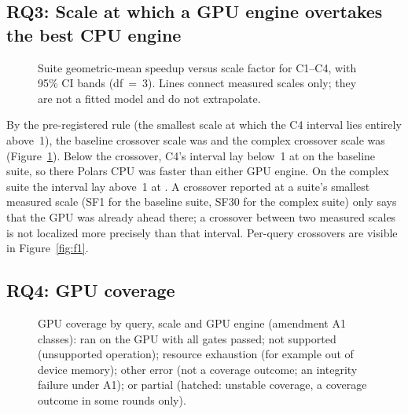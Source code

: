 \documentclass[11pt]{article}
\begin{document}
\subsection{RQ3: Scale at which a GPU engine overtakes the best CPU engine}
\label{sec:rq3}

\begin{figure}[t]
\centering
{}
\caption{Suite geometric-mean speedup versus scale factor for C1--C4, with 95\%
CI bands (df~=~3). Lines connect measured scales only; they are not a fitted
model and do not extrapolate. \chartnote}
\label{fig:f2}
\end{figure}

By the pre-registered rule (the smallest scale at which the C4 interval lies
entirely above~1), the baseline crossover scale was
 and the complex crossover scale was
 (Figure~\ref{fig:f2}).
Below the crossover, C4's interval lay below~1 at
 on the baseline suite, so there Polars CPU was
faster than either GPU engine. On the complex suite the interval lay above~1 at
. A crossover reported at a suite's smallest
measured scale (SF1 for the baseline suite, SF30 for the complex suite) only
says that the GPU was already ahead there; a crossover between two measured
scales is not localized more precisely than that interval. Per-query
crossovers are visible in Figure~\ref{fig:f1}.

\subsection{RQ4: GPU coverage}
\label{sec:rq4}

\begin{figure}[t]
\centering
{}
\caption{GPU coverage by query, scale and GPU engine (amendment A1
classes): ran on the GPU with all gates passed; not supported (unsupported
operation); resource exhaustion (for example out of device memory); other
error (not a coverage outcome; an integrity failure under A1); or partial
(hatched: unstable coverage, a coverage outcome in some rounds only).}
\label{fig:f4}
\end{figure}
\end{document}
